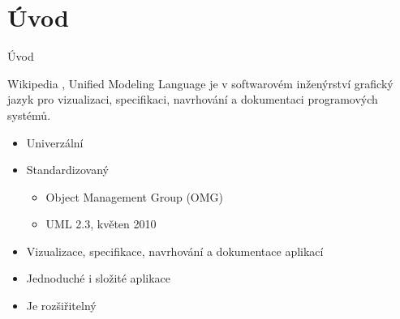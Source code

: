 \section{Úvod}




\begin{frame}{Úvod}

\begin{block}{Wikipedia}
	, Unified Modeling Language je v softwarovém inženýrství 
	grafický jazyk pro vizualizaci, specifikaci, navrhování a 
	dokumentaci programových systémů. 
\end{block}

\pause

\begin{itemize}[<+->]
	\item Univerzální
	\item Standardizovaný
	\begin{itemize}[<+->]
		\item Object Management Group (OMG)
		\item UML 2.3, květen 2010
	\end{itemize}
	\item Vizualizace, specifikace, navrhování a dokumentace aplikací
	\item Jednoduché i složité aplikace
	\item Je rozšiřitelný
\end{itemize}
	
\end{frame}

